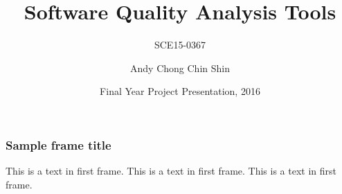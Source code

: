 \documentclass{beamer}
\title[SQAT]{Software Quality Analysis Tools}
\subtitle{SCE15-0367}
\author{Andy Chong Chin Shin}
\institute[SCSE]{School of Computer Science and Engineering}
\date[FYP, 2016]{Final Year Project Presentation, 2016}
\begin{document}
 
\frame{\titlepage}
 
\begin{frame}
\frametitle{Sample frame title}
This is a text in first frame. This is a text in first frame. This is a text in first frame.
\end{frame}
 
\end{document}
